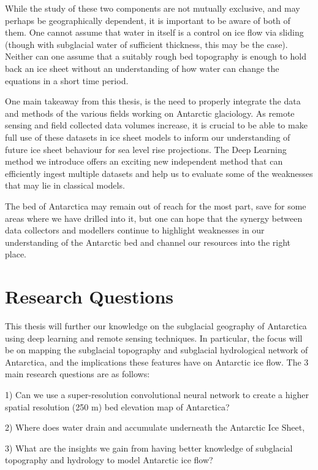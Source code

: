 While the study of these two components are not mutually exclusive, and may perhaps be geographically dependent, it is important to be aware of both of them.
One cannot assume that water in itself is a control on ice flow via sliding (though with subglacial water of sufficient thickness, this may be the case).
Neither can one assume that a suitably rough bed topography is enough to hold back an ice sheet without an understanding of how water can change the equations in a short time period.

One main takeaway from this thesis, is the need to properly integrate the data and methods of the various fields working on Antarctic glaciology.
As remote sensing and field collected data volumes increase, it is crucial to be able to make full use of these datasets in ice sheet models to inform our understanding of future ice sheet behaviour for sea level rise projections.
The Deep Learning method we introduce offers an exciting new independent method that can efficiently ingest multiple datasets and help us to evaluate some of the weaknesses that may lie in classical models.

The bed of Antarctica may remain out of reach for the most part, save for some areas where we have drilled into it, but one can hope that the synergy between data collectors and modellers continue to highlight weaknesses in our understanding of the Antarctic bed and channel our resources into the right place.


\section{Research Questions}

This thesis will further our knowledge on the subglacial geography of Antarctica using deep learning and remote sensing techniques.
In particular, the focus will be on mapping the subglacial topography and subglacial hydrological network of Antarctica, and the implications these features have on Antarctic ice flow.
The 3 main research questions are as follows:

1) Can we use a super-resolution convolutional neural network to create a higher spatial resolution (250 m) bed elevation map of Antarctica?

2) Where does water drain and accumulate underneath the Antarctic Ice Sheet,

3) What are the insights we gain from having better knowledge of subglacial topography and hydrology to model Antarctic ice flow?

